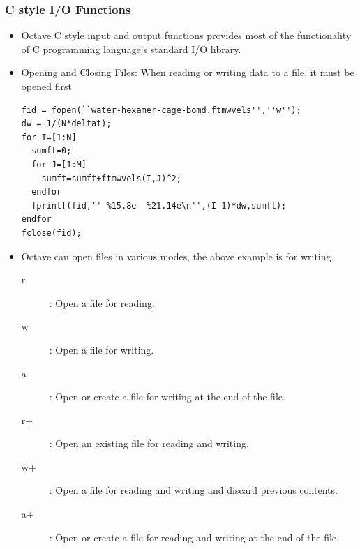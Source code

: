 \documentclass[slidestop,mathserif,compress,xcolor=svgnames]{beamer}
\begin{document}
\begin{frame}[fragile]
  \frametitle{\small C style I/O Functions}
  \begin{itemize}
    \item Octave C style input and output functions provides most of the functionality of C programming language's standard I/O library.
    \item Opening and Closing Files: When reading or writing data to a file, it must be opened first
    {\tiny
      \begin{verbatim}
fid = fopen(``water-hexamer-cage-bomd.ftmwvels'',''w'');
dw = 1/(N*deltat);
for I=[1:N]
  sumft=0;
  for J=[1:M]
    sumft=sumft+ftmwvels(I,J)^2;
  endfor
  fprintf(fid,'' %15.8e  %21.14e\n'',(I-1)*dw,sumft);
endfor
fclose(fid);
      \end{verbatim}
    }
    \item Octave can open files in various modes, the above example is for writing.
    \begin{description}
      \item[r]: Open a file for reading.
      \item[w]: Open a file for writing.
      \item[a]: Open or create a file for writing at the end of the file.
      \item[r+]: Open an existing file for reading and writing.
      \item[w+]: Open a file for reading and writing and discard previous contents.
      \item[a+]: Open or create a file for reading and writing at the end of the file.
    \end{description}
  \end{itemize}
\end{frame}
\end{document}
